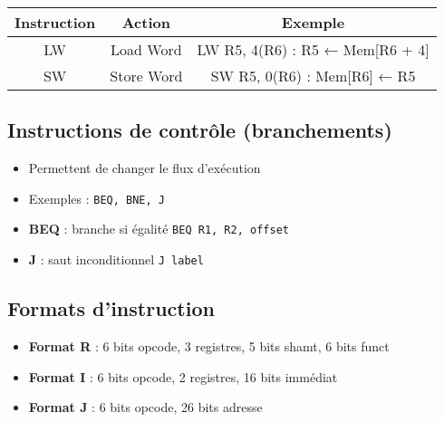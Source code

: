 \documentclass[12pt,a4paper]{article}
\begin{document}
\begin{tabular}{|c|c|c|}
\hline
\textbf{Instruction} & \textbf{Action} & \textbf{Exemple} \\
\hline
LW & Load Word & LW R5, 4(R6) : R5 ← Mem[R6 + 4] \\
SW & Store Word & SW R5, 0(R6) : Mem[R6] ← R5 \\
\hline
\end{tabular}

\subsection{Instructions de contrôle (branchements)}
\begin{itemize}
  \item Permettent de changer le flux d’exécution
  \item Exemples : \texttt{BEQ, BNE, J}
  \item \textbf{BEQ} : branche si égalité \quad \texttt{BEQ R1, R2, offset}
  \item \textbf{J} : saut inconditionnel \quad \texttt{J label}
\end{itemize}

\subsection{Formats d'instruction}
\begin{itemize}
  \item \textbf{Format R} : 6 bits opcode, 3 registres, 5 bits shamt, 6 bits funct
  \item \textbf{Format I} : 6 bits opcode, 2 registres, 16 bits immédiat
  \item \textbf{Format J} : 6 bits opcode, 26 bits adresse
\end{itemize}

\end{document}
